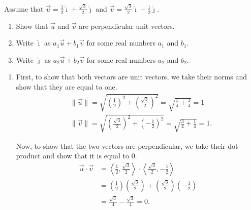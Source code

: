 \documentclass[]{ximera}
\begin{document}
\begin{problem}
Assume that $\vec{u} = \frac{1}{2} \hat{\imath} + \frac{\sqrt{3}}{2} \hat{\jmath}$ and $\vec{v} = \frac{\sqrt{3}}{2} \hat{\imath} - \frac{1}{2} \hat{\jmath}$.
	\begin{enumerate}
	\item  Show that $\vec{u}$ and $\vec{v}$ are perpendicular unit vectors.
	\item  Write $\hat{\imath}$ as $a_1 \vec{u} + b_1 \vec{v}$ for some real numbers $a_1$ and $b_1$.  
	\item  Write $\hat{\jmath}$ as $a_2 \vec{u} + b_2 \vec{v}$ for some real numbers $a_2$ and $b_2$. 
	\end{enumerate}
	
	\begin{freeResponse}
	\begin{enumerate}
	\item  First, to show that both vectors are unit vectors, we take their norms and show that they are equal to one.
		\begin{align*}
		&\| \vec{u} \| = \sqrt{ \left( \frac{1}{2} \right)^2 + \left( \frac{\sqrt{3}}{2} \right)^2} = \sqrt{ \frac{1}{4} + \frac{3}{4}} = 1  \\
		&\| \vec{v} \| = \sqrt{ \left( \frac{\sqrt{3}}{2} \right)^2 + \left( - \frac{1}{2} \right)^2} = \sqrt{\frac{3}{4}+\frac{1}{4}} = 1.
		\end{align*}
	
	Now, to show that the two vectors are perpendicular, we take their dot product and show that it is equal to $0$.
		\begin{align*}
		\vec{u} \cdot \vec{v}
		&= \left\langle \frac{1}{2}, \frac{\sqrt{3}}{2} \right\rangle \cdot \left\langle \frac{\sqrt{3}}{2}, - \frac{1}{2} \right\rangle  \\
		&= \left( \frac{1}{2} \right) \left( \frac{\sqrt{3}}{2} \right) + \left( \frac{\sqrt{3}}{2} \right) \left( - \frac{1}{2} \right)  \\
		&= \frac{\sqrt{3}}{4} - \frac{\sqrt{3}}{4} = 0.
		\end{align*}
	
	
	

\end{enumerate}
\end{freeResponse}
\end{problem}
\end{document}
